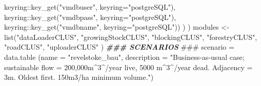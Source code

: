 \documentclass[
]{article}
\newenvironment{Shaded}{\begin{snugshade}}{\end{snugshade}}
\newcommand{\AlertTok}[1]{\textcolor[rgb]{0.94,0.16,0.16}{#1}}
\newcommand{\AttributeTok}[1]{\textcolor[rgb]{0.77,0.63,0.00}{#1}}
\newcommand{\DocumentationTok}[1]{\textcolor[rgb]{0.56,0.35,0.01}{\textbf{\textit{#1}}}}
\newcommand{\FunctionTok}[1]{\textcolor[rgb]{0.00,0.00,0.00}{#1}}
\newcommand{\NormalTok}[1]{#1}
\newcommand{\OtherTok}[1]{\textcolor[rgb]{0.56,0.35,0.01}{#1}}
\newcommand{\SpecialCharTok}[1]{\textcolor[rgb]{0.00,0.00,0.00}{#1}}
\newcommand{\StringTok}[1]{\textcolor[rgb]{0.31,0.60,0.02}{#1}}
\begin{document}
\begin{Shaded}
\begin{Highlighting}[]
\NormalTok{                                     keyring}\SpecialCharTok{::}\FunctionTok{key\_get}\NormalTok{(}\StringTok{"vmdbuser"}\NormalTok{, }\AttributeTok{keyring=}\StringTok{"postgreSQL"}\NormalTok{), }
\NormalTok{                                     keyring}\SpecialCharTok{::}\FunctionTok{key\_get}\NormalTok{(}\StringTok{"vmdbpass"}\NormalTok{, }\AttributeTok{keyring=}\StringTok{"postgreSQL"}\NormalTok{),  }
\NormalTok{                                     keyring}\SpecialCharTok{::}\FunctionTok{key\_get}\NormalTok{(}\StringTok{"vmdbname"}\NormalTok{, }\AttributeTok{keyring=}\StringTok{"postgreSQL"}\NormalTok{))}
\NormalTok{                  )}
\NormalTok{)}
\NormalTok{modules }\OtherTok{\textless{}{-}} \FunctionTok{list}\NormalTok{(}\StringTok{"dataLoaderCLUS"}\NormalTok{, }
                \StringTok{"growingStockCLUS"}\NormalTok{, }
                \StringTok{"blockingCLUS"}\NormalTok{, }
                \StringTok{"forestryCLUS"}\NormalTok{, }
                \StringTok{"roadCLUS"}\NormalTok{,  }
                \StringTok{"uploaderCLUS"}
\NormalTok{                )}
\DocumentationTok{\#\#\# SCENARIOS }\AlertTok{\#\#\#}
\NormalTok{scenario }\OtherTok{=} \FunctionTok{data.table}\NormalTok{ (}\AttributeTok{name =} \StringTok{"revelstoke\_bau"}\NormalTok{, }
                       \AttributeTok{description =} \StringTok{"Business{-}as{-}usual case; sustainable flow = 200,000m\^{}3\^{}/year live, 5000 m\^{}3\^{}/year dead. Adjacency = 3m. Oldest first. 150m3/ha minimum volume."}\NormalTok{)}


\end{Highlighting}
\end{Shaded}
\end{document}
